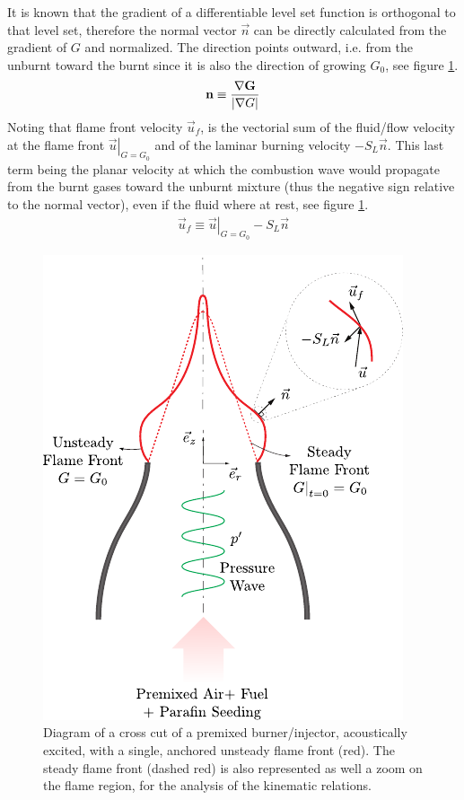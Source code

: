 \begin{definition}
It is known that the gradient of a differentiable level set function is orthogonal to that level set, therefore the normal vector $\vec{n}$ can be directly calculated from the gradient of $G$ and normalized. The direction points outward, i.e. from the unburnt toward the burnt since it is also the direction of growing $G_0$, see figure \ref{gfig}.
\begin{align}
	\mathbf{n} \equiv \dfrac{\mathbf{\nabla G}}{\left|\mathbf{\nabla} G\right|} \label{normal_eq}
\end{align}
Noting that flame front velocity $\vec{u}_f$, is the vectorial sum of the fluid/flow velocity  at the flame front $\left.\vec{u}\right|_{G=G_0}$ and of the laminar burning velocity $-S_L \vec{n}$. This last term being the planar velocity at which the combustion wave would propagate from the burnt gases toward the unburnt mixture (thus the negative sign relative to the normal vector), even if the fluid where at rest, see figure \ref{gfig}. 
\begin{align}
	\vec{u}_f \equiv \left.\vec{u}\right|_{G=G_0} -S_L \vec{n} \label{kine_eq}
\end{align}
\end{definition}

\begin{figure}[h!]
\begin{center}
\includegraphics[scale=1.3]{./img/g_equation}
\end{center}
\caption{Diagram of a cross cut of a premixed burner/injector, acoustically excited, with a single, anchored unsteady flame front (red). The steady flame front (dashed red) is also represented as well a zoom on the flame region, for the analysis of the kinematic relations.}
\label{gfig}
\end{figure}

